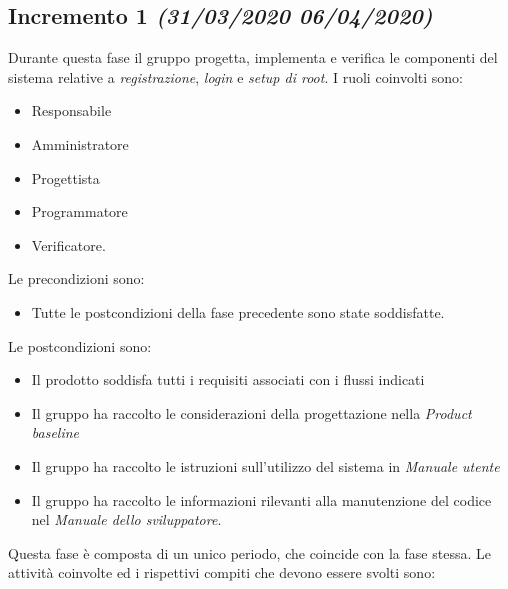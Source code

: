 \documentclass[../piano-di-progetto.tex]{subfiles}
\begin{document}
\subsection[Incremento 1]{Incremento 1 {\normalsize\normalfont\itshape(31/03/2020  06/04/2020)}}%
\label{sub:incremento_1}
Durante questa fase il gruppo progetta, implementa e verifica le componenti del sistema relative a \textit{registrazione}, \textit{login} e \textit{setup di root}.
I ruoli coinvolti sono:
\begin{itemize}
  \item Responsabile
  \item Amministratore
  \item Progettista
  \item Programmatore
  \item Verificatore.
\end{itemize}
Le precondizioni sono:
\begin{itemize}
  \item Tutte le postcondizioni della fase precedente sono state soddisfatte.
\end{itemize}
Le postcondizioni sono:
\begin{itemize}
  \item Il prodotto soddisfa tutti i requisiti associati con i flussi indicati
  \item Il gruppo ha raccolto le considerazioni della progettazione nella \textit{Product baseline}
  \item Il gruppo ha raccolto le istruzioni sull'utilizzo del sistema in \textit{Manuale utente}
  \item Il gruppo ha raccolto le informazioni rilevanti alla manutenzione del codice nel \textit{Manuale dello sviluppatore}.
\end{itemize}
Questa fase è composta di un unico periodo, che coincide con la fase stessa.
Le attività coinvolte ed i rispettivi compiti che devono essere svolti sono:
\end{document}
